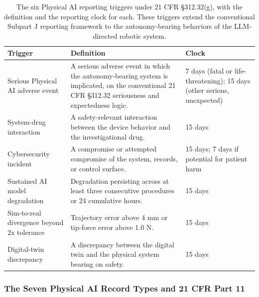 \begin{table}[htbp]
\centering
\footnotesize
\caption{The six Physical AI reporting triggers under 21 CFR \S 312.32(g), with the
definition and the reporting clock for each. These triggers extend the conventional
Subpart J reporting framework to the autonomy-bearing behaviors of the LLM-directed
robotic system.}
\label{tab:pai-triggers}
\begin{tabularx}{\textwidth}{L{4.0cm} Y L{2.8cm}}
\toprule
\textbf{Trigger} & \textbf{Definition} & \textbf{Clock} \\
\midrule
Serious Physical AI adverse event & A serious adverse event in which the autonomy-bearing system is implicated, on the conventional 21 CFR \S 312.32 seriousness and expectedness logic. & 7 days (fatal or life-threatening); 15 days (other serious, unexpected) \\
System-drug interaction & A safety-relevant interaction between the device behavior and the investigational drug. & 15 days \\
Cybersecurity incident & A compromise or attempted compromise of the system, records, or control surface. & 15 days; 7 days if potential for patient harm \\
Sustained AI model degradation & Degradation persisting across at least three consecutive procedures or 24 cumulative hours. & 15 days \\
Sim-to-real divergence beyond 2x tolerance & Trajectory error above 4 mm or tip-force error above 1.0 N. & 15 days \\
Digital-twin discrepancy & A discrepancy between the digital twin and the physical system bearing on safety. & 15 days \\
\bottomrule
\end{tabularx}
\end{table}


\subsubsection{The Seven Physical AI Record Types and 21 CFR Part 11}

